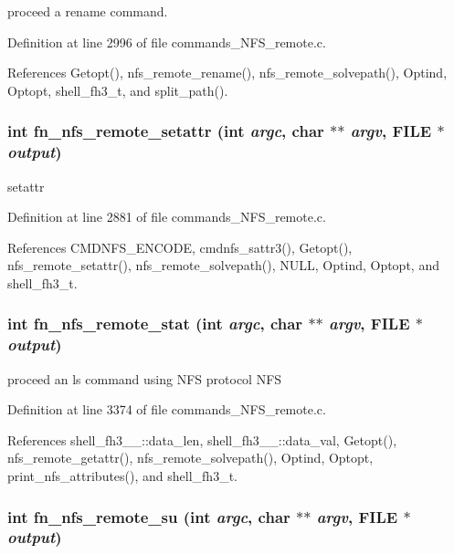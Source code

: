 proceed a rename command. 

Definition at line 2996 of file commands\_\-NFS\_\-remote.c.

References Getopt(), nfs\_\-remote\_\-rename(), nfs\_\-remote\_\-solvepath(), Optind, Optopt, shell\_\-fh3\_\-t, and split\_\-path().
\subsubsection{\setlength{\rightskip}{0pt plus 5cm}int fn\_\-nfs\_\-remote\_\-setattr (int {\em argc}, char $\ast$$\ast$ {\em argv}, FILE $\ast$ {\em output})}\label{commands__NFS__remote_8c_a65}


setattr 

Definition at line 2881 of file commands\_\-NFS\_\-remote.c.

References CMDNFS\_\-ENCODE, cmdnfs\_\-sattr3(), Getopt(), nfs\_\-remote\_\-setattr(), nfs\_\-remote\_\-solvepath(), NULL, Optind, Optopt, and shell\_\-fh3\_\-t.
\subsubsection{\setlength{\rightskip}{0pt plus 5cm}int fn\_\-nfs\_\-remote\_\-stat (int {\em argc}, char $\ast$$\ast$ {\em argv}, FILE $\ast$ {\em output})}\label{commands__NFS__remote_8c_a69}


proceed an ls command using NFS protocol NFS 

Definition at line 3374 of file commands\_\-NFS\_\-remote.c.

References shell\_\-fh3\_\-\_\-::data\_\-len, shell\_\-fh3\_\-\_\-::data\_\-val, Getopt(), nfs\_\-remote\_\-getattr(), nfs\_\-remote\_\-solvepath(), Optind, Optopt, print\_\-nfs\_\-attributes(), and shell\_\-fh3\_\-t.
\subsubsection{\setlength{\rightskip}{0pt plus 5cm}int fn\_\-nfs\_\-remote\_\-su (int {\em argc}, char $\ast$$\ast$ {\em argv}, FILE $\ast$ {\em output})}\label{commands__NFS__remote_8c_a70}


